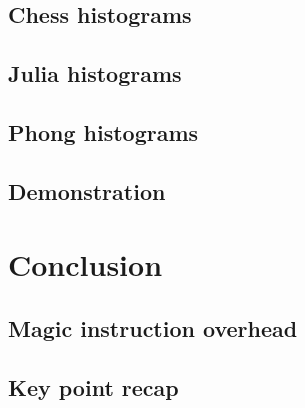 \documentclass{beamer}
\begin{document}
	\subsection{Chess histograms}
	
	\subsection{Julia histograms}
	
	\subsection{Phong histograms}
	
	\subsection{Demonstration}
	

	\section{Conclusion}
	\subsection{Magic instruction overhead}
	
	\subsection{Key point recap}
	

	

	

	
\end{document}
